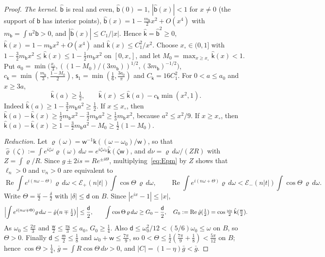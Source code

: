 \documentclass[11pt]{article}
\theoremstyle{definition}
\theoremstyle{remark}
\newcommand{\Rea}{\operatorname{Re}}
\begin{document}
\begin{proof}
\emph{The kernel.}  \(\hat{\mathsf b}\) is real and even, \(\hat{\mathsf b}(0)=1\), \(|\hat{\mathsf b}(x)|<1\) for \(x\ne0\) (the
support of \(\mathsf b\) has interior points), \(\hat{\mathsf b}(x)=1-\frac{m_{\mathsf b}}2x^2+O(x^4)\) with
\(m_{\mathsf b}=\int u^2\mathsf b>0\), and \(|\hat{\mathsf b}(x)|\le C_1/|x|\).  Hence \(\hat{\mathsf k}=\hat{\mathsf b}^2\ge0\),
\(\hat{\mathsf k}(x)=1-m_{\mathsf b}x^2+O(x^4)\) and \(\hat{\mathsf k}(x)\le C_1^2/x^2\).  Choose \(x_\circ\in(0,1]\) with
\(1-\frac32m_{\mathsf b}x^2\le\hat{\mathsf k}(x)\le1-\frac12m_{\mathsf b}x^2\) on \([0,x_\circ]\), and let
\(M_0=\max_{x\ge x_\circ}\hat{\mathsf k}(x)<1\).  Put
\(a_0=\min\bigl(\frac{x_\circ}3,((1-M_0)/(3m_{\mathsf b}))^{1/2},(3m_{\mathsf b})^{-1/2}\bigr)\),
\(c_{\mathsf k}=\min(\frac{m_{\mathsf b}}3,\frac{1-M_0}2)\), \(\mathsf s_1=\min(\frac16,\frac{3a_0}\pi)\) and \(C_{\mathsf k}=16C_1^2\).
For \(0<a\le a_0\) and \(x\ge3a\),
\begin{equation}\label{eq:kgap}
\hat{\mathsf k}(a)\ge\tfrac12,\qquad \hat{\mathsf k}(x)\le\hat{\mathsf k}(a)-c_{\mathsf k}\min(x^2,1).
\end{equation}
Indeed \(\hat{\mathsf k}(a)\ge1-\frac32m_{\mathsf b}a^2\ge\frac12\).  If \(x\le x_\circ\), then
\(\hat{\mathsf k}(a)-\hat{\mathsf k}(x)\ge\frac12m_{\mathsf b}x^2-\frac32m_{\mathsf b}a^2\ge\frac13m_{\mathsf b}x^2\), because \(a^2\le x^2/9\).  If
\(x\ge x_\circ\), then \(\hat{\mathsf k}(a)-\hat{\mathsf k}(x)\ge1-\frac32m_{\mathsf b}a^2-M_0\ge\frac12(1-M_0)\).

\emph{Reduction.}  Let \(\varrho(\omega)=\mathsf w^{-1}\mathsf k((\omega-\omega_0)/\mathsf w)\), so that
\(\hat\varrho(\zeta):=\int e^{i\zeta\omega}\varrho(\omega)\,d\omega=e^{i\zeta\omega_0}\hat{\mathsf k}(\zeta \mathsf w)\), and \(d\nu=\varrho\,d\omega/(ZR)\) with
\(Z=\int\varrho/R\).  Since \(g\pm2is=Re^{\pm i\Theta}\), multiplying~\eqref{eq:Epm} by \(Z\) shows that
\(\ell_n>0\) and \(\upsilon_n>0\) are equivalent to
\[
\Rea\int e^{i(n\omega-\Theta)}\varrho\,d\omega<\mathcal E_+(n|t|)\int\cos\Theta\,\varrho\,d\omega,\qquad
\Rea\int e^{i(n\omega+\Theta)}\varrho\,d\omega<\mathcal E_-(n|t|)\int\cos\Theta\,\varrho\,d\omega .
\]
Write \(\Theta=\frac\omega2-\frac\delta2\) with \(|\delta|\le\mathsf d\) on \(B\).  Since \(|e^{ix}-1|\le|x|\),
\[
\Bigl|\int e^{i(n\omega\mp\Theta)}\varrho\,d\omega-\hat\varrho\bigl(n\mp\tfrac12\bigr)\Bigr|\le\frac{\mathsf d}2,\qquad
\int\cos\Theta\,\varrho\,d\omega\ge G_0-\frac{\mathsf d}2,\quad G_0:=\Rea\hat\varrho(\tfrac12)=\cos\tfrac{\omega_0}2\,\hat{\mathsf k}(\tfrac{\mathsf w}2).
\]
As \(\omega_0\le\frac{2\pi}3\) and \(\frac{\mathsf w}2\le\frac{\pi\mathsf s}3\le a_0\), \(G_0\ge\frac14\).
Also \(\mathsf d\le\omega_0^2/12<(5/6)\omega_0\le\omega\) on \(B\),
so \(\Theta>0\).  Finally \(\mathsf d\le\frac{\mathsf m}2\le\frac18\) and
\(\omega_0+\mathsf w\le\frac{7\pi}9\), so \(0<\Theta\le\frac12(\frac{7\pi}9+\frac18)<\frac{5\pi}{12}\) on \(B\); hence \(\cos\Theta>\frac14\),
\(\bar g=\int R\cos\Theta\,d\nu>0\), and \(|C|=(1-\eta)\bar g<\bar g\).


\end{proof}
\end{document}
